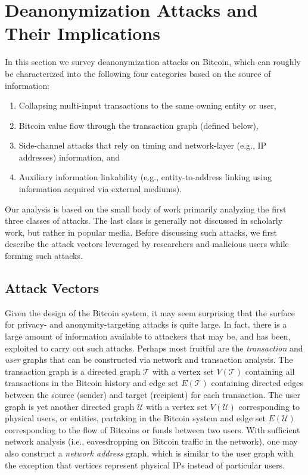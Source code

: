 \section{Deanonymization Attacks and Their Implications}
In this section we survey deanonymization attacks on Bitcoin, which can roughly be characterized into the following four categories based on the source of information:
\begin{enumerate}
	\item Collapsing multi-input transactions to the same owning entity or user,
	\item Bitcoin value flow through the transaction graph (defined below),
	\item Side-channel attacks that rely on timing and network-layer (e.g., IP addresses) information, and
	\item Auxiliary information linkability (e.g., entity-to-address linking using information acquired via external mediums).
\end{enumerate}
Our analysis is based on the small body of work primarily analyzing the first three classes of attacks. The last class is generally not discussed in scholarly work, but rather in popular media. Before discussing such attacks, we first describe the attack vectors leveraged by researchers and malicious users while forming such attacks.

\subsection{Attack Vectors} \label{sec:vectors}
Given the design of the Bitcoin system, it may seem surprising that the surface for privacy- and anonymity-targeting attacks is quite large. In fact, there is a large amount of information available to attackers that may be, and has been, exploited to carry out such attacks. Perhaps most fruitful are the \emph{transaction} and \emph{user} graphs that can be constructed via network and transaction analysis. The transaction graph is a directed graph $\mathcal{T}$ with a vertex set $V(\mathcal{T})$ containing all transactions in the Bitcoin history and edge set $E(\mathcal{T})$ containing directed edges between the source (sender) and target (recipient) for each transaction. The user graph is yet another directed graph $\mathcal{U}$ with a vertex set $V(\mathcal{U})$ corresponding to physical users, or entities, partaking in the Bitcoin system and edge set $E(\mathcal{U})$ corresponding to the flow of Bitcoins or funds between two users. With sufficient network analysis (i.e., eavesdropping on Bitcoin traffic in the network), one may also construct a \emph{network address} graph, which is similar to the user graph with the exception that vertices represent physical IPs instead of particular users. 

